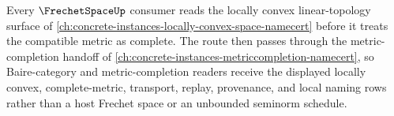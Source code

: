 Every $\FrechetSpaceUp$ consumer reads the locally convex linear-topology surface of \autoref{ch:concrete-instances-locally-convex-space-namecert} before it treats the compatible metric as complete. The route then passes through the metric-completion handoff of \autoref{ch:concrete-instances-metriccompletion-namecert}, so Baire-category and metric-completion readers receive the displayed locally convex, complete-metric, transport, replay, provenance, and local naming rows rather than a host Frechet space or an unbounded seminorm schedule.

